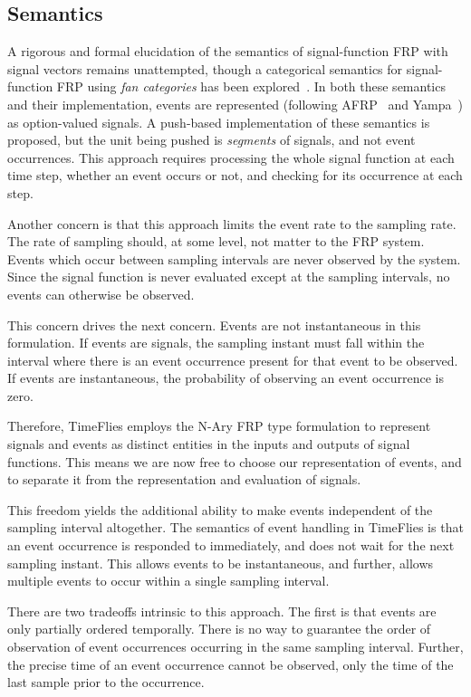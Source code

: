 \subsection{Semantics}
\label{subsection:System_Design_and_Interface-Semantics}

A rigorous and formal elucidation of the semantics of signal-function FRP with signal
vectors remains unattempted, though a categorical semantics for signal-function
FRP using {\em fan categories} has been explored~\cite{Jeffrey2012}. In both
these semantics and their implementation, events are represented (following
AFRP~\cite{Courtney2001-1} and Yampa~\cite{Nilsson2005}) as option-valued
signals. A push-based implementation of these semantics is proposed, but the
unit being pushed is {\em segments} of signals, and not event occurrences. This
approach requires processing the whole signal function at each time step,
whether an event occurs or not, and checking for its occurrence at each step.

Another concern is that this approach limits the event rate to the sampling rate.
The rate of sampling should, at some level, not matter to the FRP system. Events
which occur between sampling intervals are never observed by the system. Since
the signal function is never evaluated except at the sampling intervals, no
events can otherwise be observed.

This concern drives the next concern. Events are not instantaneous in this
formulation. If events are signals, the sampling instant must fall within
the interval where there is an event occurrence present for that event to be
observed. If events are instantaneous, the probability of observing an event 
occurrence is zero.

Therefore, TimeFlies employs the N-Ary FRP type formulation to represent signals and
events as distinct entities in the inputs and outputs of signal functions. This means
we are now free to choose our representation of events, and to separate it from the
representation and evaluation of signals.

This freedom yields the additional ability to make events independent of the sampling
interval altogether. The semantics of event handling in TimeFlies is that an event occurrence
is responded to immediately, and does not wait for the next sampling instant. This allows events
to be instantaneous, and further, allows multiple events to occur within a single sampling interval.

There are two tradeoffs intrinsic to this approach. The first is that events are only partially ordered
temporally. There is no way to guarantee the order of observation of event occurrences occurring in the
same sampling interval. Further, the precise time of an event occurrence cannot be observed, only the 
time of the last sample prior to the occurrence.

